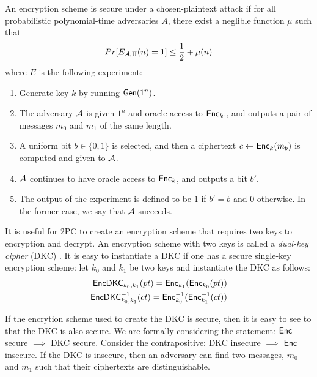 \begin{definition}
An encryption scheme is secure under a chosen-plaintext attack if for all probabilistic polynomial-time adversaries $A$, there exist a neglible function $\mu$ such that
\begin{equation}
Pr[E_{\mathcal{A}, \Pi}(n) = 1] \leq \frac{1}{2} + \mu(n)
\end{equation}
where $E$ is the following experiment:
\begin{enumerate}
\item Generate key $k$ by running $\textsf{Gen}(1^n)$. 
\item The adversary $\mathcal{A}$ is given $1^n$ and oracle access to $\textsf{Enc}_k$., and outputs a pair of messages $m_0$ and $m_1$ of the same length.
\item A uniform bit $b \in \{0,1\}$ is selected, and then a ciphertext $c \gets \textsf{Enc}_k(m_b)$ is computed and given to $\mathcal{A}$.  
\item $\mathcal{A}$ continues to have oracle access to $\textsf{Enc}_k$, and outputs a bit $b'$. 
\item The output of the experiment is defined to be $1$ if $b' = b$ and $0$ otherwise. In the former case, we say that $\mathcal{A}$ succeeds.
\end{enumerate}
\end{definition}

It is useful for 2PC to create an encryption scheme that requires two keys to encryption and decrypt.
An encryption scheme with two keys is called a \textit{dual-key cipher} (DKC) \cite{bellare2012foundations}.
It is easy to instantiate a DKC if one has a secure single-key encryption scheme: let $k_0$ and $k_1$ be two keys and instantiate the DKC as follows:
\begin{equation}
    \begin{split}
        \textsf{EncDKC}_{k_0, k_1}(pt) = \textsf{Enc}_{k_1} ( \textsf{Enc}_{k_0} ( pt )) \\
        \textsf{EncDKC}^{-1}_{k_0, k_1}(ct) = \textsf{Enc}^{-1}_{k_0} ( \textsf{Enc}^{-1}_{k_1} ( ct )) 
    \end{split}
\end{equation}

If the encrytion scheme used to create the DKC is secure, then it is easy to see to that the DKC is also secure.
We are formally considering the statement: $\textsf{Enc}$ secure $\implies$ DKC secure. 
Consider the contrapositive: DKC insecure $\implies$ $\textsf{Enc}$ insecure. 
If the DKC is insecure, then an adversary can find two messages, $m_0$ and $m_1$ such that their ciphertexts are distinguishable. 

